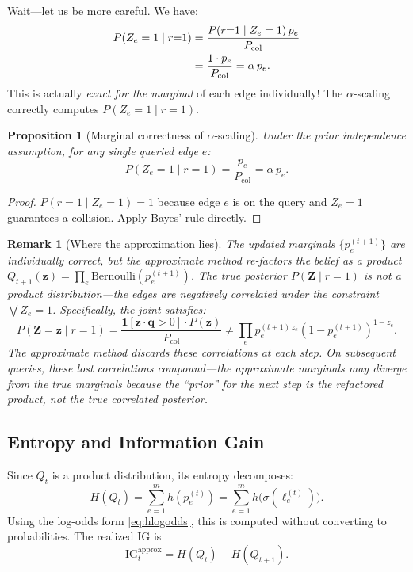 \documentclass[11pt]{article}
\newcommand{\Ber}{\mathrm{Bernoulli}}
\newcommand{\sigmoid}{\sigma}
\newtheorem{proposition}{Proposition}
\newtheorem{remark}{Remark}
\begin{document}
Wait---let us be more careful.  We have:
\begin{align}
  P(Z_e = 1 \mid r{=}1)
  &= \frac{P(r{=}1 \mid Z_e = 1)\, p_e}{P_{\text{col}}} \notag \\
  &= \frac{1 \cdot p_e}{P_{\text{col}}} = \alpha\, p_e.
  \label{eq:marginal-exact}
\end{align}
This is actually \emph{exact for the marginal} of each edge individually!
The $\alpha$-scaling correctly computes $P(Z_e = 1 \mid r = 1)$.

\begin{proposition}[Marginal correctness of $\alpha$-scaling]
\label{prop:marginal-correct}
Under the prior independence assumption, for any single queried edge $e$:
\[
  P(Z_e = 1 \mid r{=}1) = \frac{p_e}{P_{\text{col}}} = \alpha\, p_e.
\]
\end{proposition}

\begin{proof}
$P(r{=}1 \mid Z_e = 1) = 1$ because edge $e$ is on the query and $Z_e = 1$
guarantees a collision.  Apply Bayes' rule directly.
\end{proof}

\begin{remark}[Where the approximation lies]
The updated marginals $\{p_e^{(t+1)}\}$ are individually correct, but the
approximate method \emph{re-factors} the belief as a product
$Q_{t+1}(\mathbf{z}) = \prod_e \Ber(p_e^{(t+1)})$.  The true posterior
$P(\mathbf{Z} \mid r{=}1)$ is \emph{not} a product distribution---the
edges are negatively correlated under the constraint
$\bigvee Z_e = 1$.  Specifically, the joint satisfies:
\[
  P(\mathbf{Z} = \mathbf{z} \mid r{=}1)
  = \frac{\mathbf{1}[\mathbf{z} \cdot \mathbf{q} > 0] \cdot P(\mathbf{z})}{P_{\text{col}}}
  \neq \prod_e p_e^{(t+1)\,z_e}(1-p_e^{(t+1)})^{1-z_e}.
\]
The approximate method discards these correlations at each step.
On subsequent queries, these lost correlations compound---the
approximate marginals may diverge from the true marginals because
the ``prior'' for the next step is the refactored product, not
the true correlated posterior.
\end{remark}

\subsection{Entropy and Information Gain}

Since $Q_t$ is a product distribution, its entropy decomposes:
\begin{equation}
  H(Q_t) = \sum_{e=1}^{m} h(p_e^{(t)}) = \sum_{e=1}^m h\bigl(\sigmoid(\ell_e^{(t)})\bigr).
  \label{eq:approx-entropy}
\end{equation}
Using the log-odds form \eqref{eq:hlogodds}, this is computed without
converting to probabilities.  The realized IG is
\[
  \mathrm{IG}_t^{\text{approx}} = H(Q_t) - H(Q_{t+1}).
\]
\end{document}
